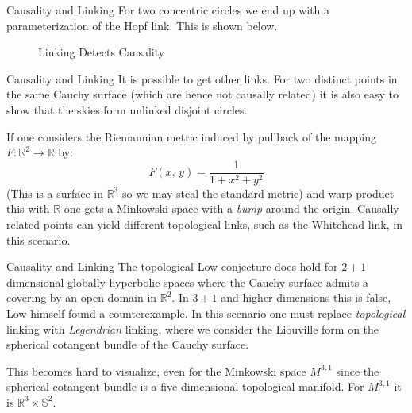 \documentclass{beamer}
\begin{document}
    \begin{frame}{Causality and Linking}
        For two concentric circles we end up with a parameterization of the
        Hopf link. This is shown below.
        \begin{figure}
            \centering
            \caption{Linking Detects Causality}
            \label{fig:linking_detects_causality_001}
        \end{figure}
    \end{frame}
    \begin{frame}{Causality and Linking}
        It is possible to get other links. For two distinct points in the same
        Cauchy surface (which are hence not causally related) it is also easy
        to show that the skies form unlinked disjoint circles.
        \par\hfill\par
        If one considers the Riemannian metric induced by pullback of the
        mapping $F:\mathbb{R}^{2}\rightarrow\mathbb{R}$ by:
        \begin{equation}
            F(x,\,y)=\frac{1}{1+x^{2}+y^{2}}
        \end{equation}
        (This is a surface in $\mathbb{R}^{3}$ so we may steal the standard
        metric) and warp product this with $\mathbb{R}$ one gets a Minkowski
        space with a \textit{bump} around the origin. Causally related points
        can yield different topological links, such as the Whitehead link, in
        this scenario.
    \end{frame}
    \begin{frame}{Causality and Linking}
        The topological Low conjecture does hold for $2+1$ dimensional globally
        hyperbolic spaces where the Cauchy surface admits a covering by an open
        domain in $\mathbb{R}^{2}$. In $3+1$ and higher dimensions this is
        false, Low himself found a counterexample. In this scenario one must
        replace \textit{topological} linking with \textit{Legendrian} linking,
        where we consider the Liouville form on the spherical cotangent bundle
        of the Cauchy surface.
        \par\hfill\par
        This becomes hard to visualize, even for the Minkowski space $M^{3,1}$
        since the spherical cotangent bundle is a five dimensional topological
        manifold. For $M^{3,1}$ it is $\mathbb{R}^{3}\times\mathbb{S}^{2}$.
    \end{frame}
\end{document}
